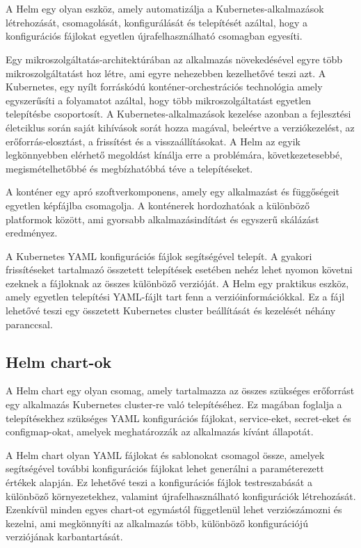 \chapter{\helm}
A Helm egy olyan eszköz, amely automatizálja a Kubernetes-alkalmazások létrehozását, csomagolását, konfigurálását és telepítését azáltal, hogy a konfigurációs fájlokat egyetlen újrafelhasználható csomagban egyesíti.

Egy mikroszolgáltatás-architektúrában az alkalmazás növekedésével egyre több mikroszolgáltatást hoz létre, ami egyre nehezebben kezelhetővé teszi azt. A Kubernetes, egy nyílt forráskódú konténer-orchestrációs technológia amely egyszerűsíti a folyamatot azáltal, hogy több mikroszolgáltatást egyetlen telepítésbe csoportosít. A Kubernetes-alkalmazások kezelése azonban a fejlesztési életciklus során saját kihívások sorát hozza magával, beleértve a verziókezelést, az erőforrás-elosztást, a frissítést és a visszaállításokat. A Helm az egyik legkönnyebben elérhető megoldást kínálja erre a problémára, következetesebbé, megismételhetőbbé és megbízhatóbbá téve a telepítéseket.

A konténer egy apró szoftverkomponens, amely egy alkalmazást és függőségeit egyetlen képfájlba csomagolja. A konténerek hordozhatóak a különböző platformok között, ami gyorsabb alkalmazásindítást és egyszerű skálázást eredményez.

A Kubernetes YAML konfigurációs fájlok segítségével telepít. A gyakori frissítéseket tartalmazó összetett telepítések esetében nehéz lehet nyomon követni ezeknek a fájloknak az összes különböző verzióját. A Helm egy praktikus eszköz, amely egyetlen telepítési YAML-fájlt tart fenn a verzióinformációkkal. Ez a fájl lehetővé teszi egy összetett Kubernetes cluster beállítását és kezelését néhány paranccsal.
\cite{helm}

\section{Helm chart-ok}
A Helm chart egy olyan csomag, amely tartalmazza az összes szükséges erőforrást egy alkalmazás Kubernetes cluster-re való telepítéséhez. Ez magában foglalja a telepítésekhez szükséges YAML konfigurációs fájlokat, service-eket, secret-eket és configmap-okat, amelyek meghatározzák az alkalmazás kívánt állapotát.

A Helm chart olyan YAML fájlokat és sablonokat csomagol össze, amelyek segítségével további konfigurációs fájlokat lehet generálni a paraméterezett értékek alapján. Ez lehetővé teszi a konfigurációs fájlok testreszabását a különböző környezetekhez, valamint újrafelhasználható konfigurációk létrehozását. Ezenkívül minden egyes chart-ot egymástól függetlenül lehet verziószámozni és kezelni, ami megkönnyíti az alkalmazás több, különböző konfigurációjú verziójának karbantartását.
\cite{helm}

